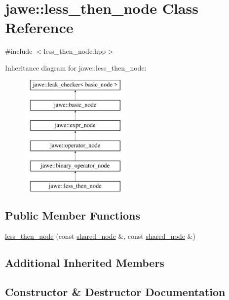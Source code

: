 \hypertarget{classjawe_1_1less__then__node}{}\section{jawe\+:\+:less\+\_\+then\+\_\+node Class Reference}
\label{classjawe_1_1less__then__node}


{\ttfamily \#include $<$less\+\_\+then\+\_\+node.\+hpp$>$}

Inheritance diagram for jawe\+:\+:less\+\_\+then\+\_\+node\+:\begin{figure}[H]
\begin{center}
\leavevmode
\includegraphics[height=6.000000cm]{classjawe_1_1less__then__node}
\end{center}
\end{figure}
\subsection*{Public Member Functions}
\begin{DoxyCompactItemize}
\item 
\hyperlink{classjawe_1_1less__then__node_a9fe51fd86467fea2296b07bb787c704f}{less\+\_\+then\+\_\+node} (const \hyperlink{namespacejawe_a3f307481d921b6cbb50cc8511fc2b544}{shared\+\_\+node} \&, const \hyperlink{namespacejawe_a3f307481d921b6cbb50cc8511fc2b544}{shared\+\_\+node} \&)
\end{DoxyCompactItemize}
\subsection*{Additional Inherited Members}


\subsection{Constructor \& Destructor Documentation}
\mbox{\label{classjawe_1_1less__then__node_a9fe51fd86467fea2296b07bb787c704f}} 

